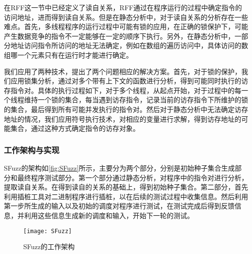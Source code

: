 在RFF这一节中已经定义了读自关系，RFF通过在程序运行的过程中确定指令的访问地址，进而得到读自关系。但是在静态分析中，对于读自关系的分析存在一些难点。首先，多线程程序的运行过程中可能有锁的应用，在正确的锁保护下，可能产生数据竞争的指令不一定能够在一定的顺序下执行。另外，在静态分析中，一部分地址访问指令所访问的地址无法确定，例如在数组的遍历访问中，具体访问的数组哪一个元素只有在运行时才能进行确定。

我们应用了两种技术，提出了两个问题相应的解决方案。首先，对于锁的保护，我们应用锁集分析，通过对多个带有上下文的函数进行分析，得到可能同时执行的访存指令对。具体的执行过程如下，对于多个线程，从起点开始，对于过程中的每一个线程维持一个锁的集合，每当遇到访存指令，记录当前的访存指令下所维护的锁的集合，最后得到所有可能并发执行的指令对。然后对于静态分析中无法确定访存地址的情况，我们应用符号执行技术，对相应的变量进行求解，得到访存地址的可能集合，通过这种方式确定指令的访存对象。

\subsubsection{工作架构与实现}

SFuzz的架构如\autoref{fig:SFuzz}所示，主要分为两个部分，分别是初始种子集合生成部分和最终程序测试部分。第一个部分通过静态分析，对程序中的指令对进行分析，提取读自关系。在得到读自的关系的基础上，得到初始种子集合。第二部分，首先利用插桩工具对二进制程序进行插桩，以在后续的测试过程中收集信息。然后利用第一步所生成的输入以及初始的调度对程序进行测试，在测试完成后得到反馈信息，并利用这些信息生成新的调度和输入，开始下一轮的测试。

\begin{figure}[ht]
    \centering
    \texttt{[image: SFuzz]}
    \caption{\label{fig:SFuzz}SFuzz的工作架构}
\end{figure}
